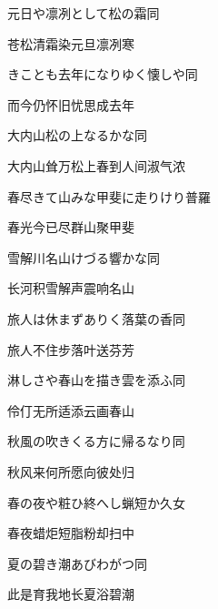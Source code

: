 \begin{haiku}
    {\FH 元日や凛冽として松の霜}\hfill{\FH 同}

    {\FK 苍松清霜染元旦凛冽寒}
\end{haiku}

\begin{haiku}
    {\FH {}きことも去年になりゆく懐しや}\hfill{\FH 同}

    {\FK 而今仍怀旧忧思成去年}
\end{haiku}

\begin{haiku}
    {\FH 大内山松の上なるかな}\hfill{\FH 同}

    {\FK 大内山耸万松上春到人间淑气浓}
\end{haiku}

\begin{haiku}
    {\FH 春尽きて山みな甲斐に走りけり}\hfill{\FH 普羅}

    {\FK 春光今已尽群山聚甲斐}
\end{haiku}

\begin{haiku}
    {\FH 雪解川名山けづる響かな}\hfill{\FH 同}

    {\FK 长河积雪解声震响名山}
\end{haiku}

\begin{haiku}
    {\FH 旅人は休まずありく落葉の香}\hfill{\FH 同}

    {\FK 旅人不住步落叶送芬芳}
\end{haiku}

\begin{haiku}
    {\FH 淋しさや春山を描き雲を添ふ}\hfill{\FH 同}

    {\FK 伶仃无所适添云画春山}
\end{haiku}

\begin{haiku}
    {\FH 秋風の吹きくる方に帰るなり}\hfill{\FH 同}

    {\FK 秋风来何所愿向彼处归}
\end{haiku}

\begin{haiku}
    {\FH 春の夜や粧ひ終へし蝋短か}\hfill{\FH 久女}

    {\FK 春夜蜡炬短脂粉却扫中}
\end{haiku}

\begin{haiku}
    {\FH {}夏の碧き潮あびわがつ}\hfill{\FH 同}

    {\FK 此是育我地长夏浴碧潮}
\end{haiku}

